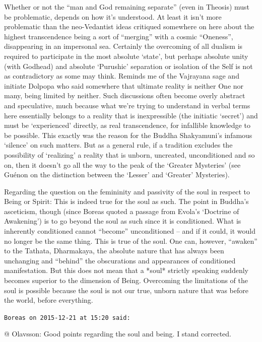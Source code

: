 \begin{footnotesize}
\begin{sffamily}
Whether or not the ``man and God remaining separate'' (even in Theosis) must be problematic, depends on how it's understood. At least it isn't more problematic than the neo-Vedantist ideas critiqued somewhere on here about the highest transcendence being a sort of ``merging'' with a cosmic ``Oneness'', disappearing in an impersonal sea. Certainly the overcoming of all dualism is required to participate in the most absolute `state', but perhaps absolute unity (with Godhead) and absolute `Purushic' separation or isolation of the Self is not as contradictory as some may think. Reminds me of the Vajrayana sage and initiate Dolpopa who said somewhere that ultimate reality is neither One nor many, being limited by neither. Such discussions often become overly abstract and speculative, much because what we're trying to understand in verbal terms here essentially belongs to a reality that is inexpressible (the initiatic `secret') and must be `experienced' directly, as real transcendence, for infallible knowledge to be possible. This exactly was the reason for the Buddha Shakyamuni's infamous `silence' on such matters. But as a general rule, if a tradition excludes the possibility of `realizing' a reality that is unborn, uncreated, unconditioned and so on, then it doesn't go all the way to the peak of the `Greater Mysteries' (see Guénon on the distinction between the `Lesser' and `Greater' Mysteries).

Regarding the question on the femininity and passivity of the soul in respect to Being or Spirit: This is indeed true for the soul as such. The point in Buddha's asceticism, though (since Boreas quoted a passage from Evola's `Doctrine of Awakening') is to go beyond the soul as such since it is conditioned. What is inherently conditioned cannot ``become'' unconditioned -- and if it could, it would no longer be the same thing. This is true of the soul. One can, however, ``awaken'' to the Tathata, Dharmakaya, the absolute nature that has always been unchanging and ``behind'' the obscurations and appearances of conditioned manifestation. But this does not mean that a *soul* strictly speaking suddenly becomes superior to the dimension of Being. Overcoming the limitations of the soul is possible because the soul is not our true, unborn nature that was before the world, before everything.

\hfill

\texttt{Boreas on 2015-12-21 at 15:20 said:}

@ Olavsson: Good points regarding the soul and being. I stand corrected.


\end{sffamily}
\end{footnotesize}
